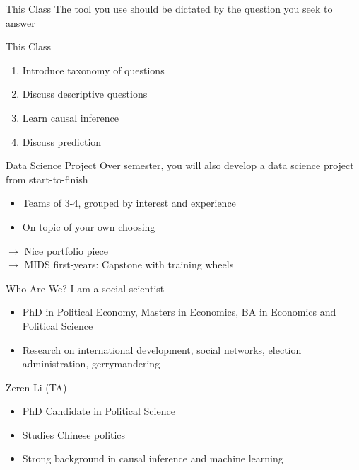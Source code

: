 \documentclass[11pt]{beamer}
\begin{document}
\begin{frame}[c]{This Class}
The tool you use should be dictated by the question you seek to answer
\end{frame}

\begin{frame}[c]{This Class}
\begin{enumerate}
  \item Introduce taxonomy of questions\\
  \item Discuss descriptive questions \\
  \item Learn causal inference \\
  \item Discuss prediction \\
\end{enumerate}
\end{frame}

\begin{frame}[c]{Data Science Project}
Over semester, you will also develop a data science project from start-to-finish
\begin{itemize}
  \item Teams of 3-4, grouped by interest and experience
  \item On topic of your own choosing
\end{itemize}
\pause $\rightarrow$ Nice portfolio piece\\
\pause $\rightarrow$ MIDS first-years: Capstone with training wheels
\end{frame}

\begin{frame}[c]{Who Are We?}
  	I am a social scientist
  	\begin{itemize}
  		\pause \item PhD in Political Economy, Masters in Economics, BA in Economics and Political Science
      \item Research on international development, social networks, election administration, gerrymandering
  	\end{itemize}
    \vspace*{0.5cm}
    \pause Zeren Li (TA)
    \begin{itemize}
      \pause \item PhD Candidate in Political Science
       \item Studies Chinese politics
       \item Strong background in causal inference and machine learning
    \end{itemize}
\end{frame}
\end{document}
